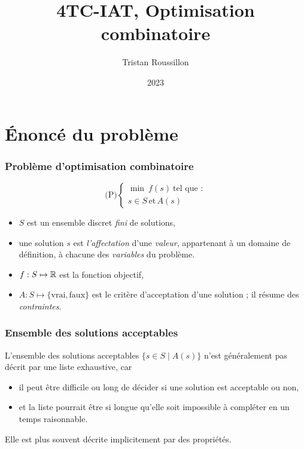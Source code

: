 \documentclass{beamer}
\title[]
 {4TC-IAT, Optimisation combinatoire}
\author[T. Roussillon]
 {Tristan Roussillon}
\date{2023}
\institute{INSA Lyon, TC}
\newcommand{\R}{{\ensuremath\mathbb{R}}}
\begin{document}
\begin{frame}
  \titlepage
\end{frame}

\section{\'Enoncé du problème}

\begin{frame}
  \frametitle{Problème d'optimisation combinatoire}

  \[
  \text{(P)} \left\{
  \begin{array}{c}
    \min \ f(s) \ \text{tel que :} \\
    s \in S \, \text{et} \, A(s)
  \end{array}
  \right.
  \]

  \begin{itemize}
  \item $S$ est un ensemble discret \emph{fini} de solutions,
  \item une solution $s$ est \emph{l'affectation} d'une \emph{valeur}, appartenant à un domaine de définition, à chacune des \emph{variables} du problème. 
  \item $f : S \mapsto \R$ est la fonction objectif,
  \item $A : S \mapsto \{\text{vrai},\text{faux}\}$ est le critère d'acceptation d'une solution ; il résume des \emph{contraintes}. 
  \end{itemize}
\end{frame}

\begin{frame}
  \frametitle{Ensemble des solutions acceptables}

  L'ensemble des solutions acceptables $\{ s \in S \mid A(s) \}$
  n'est généralement pas décrit par une liste exhaustive, car

  \begin{itemize}
  \item il peut être difficile ou long de décider si une solution est acceptable ou non,
  \item et la liste pourrait être si longue qu'elle soit impossible à compléter en un temps raisonnable. 
  \end{itemize}
  
  Elle est plus souvent décrite implicitement par des propriétés.  

\end{frame}
\end{document}

